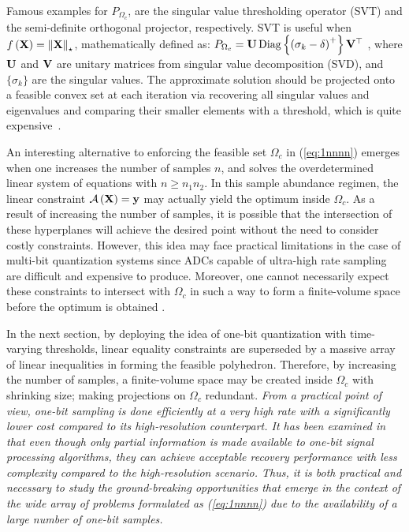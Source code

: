 \documentclass[12pt,draftcls,onecolumn]{IEEEtran}
\begin{document}
Famous examples for $P_{\Omega_{c}}$, are the singular value thresholding operator (SVT) and the semi-definite orthogonal projector, respectively. SVT is useful when $f\left(\mathbf{X}\right)=\left\|\mathbf{X}\right\|_{\star}$, mathematically defined as:
$P_{\Omega_{c}} = \mathbf{U} \operatorname{Diag}\left\{\left(\sigma_{k}-\delta\right)^{+}\right\}\mathbf{V}^{\top}$ \cite{cai2010singular},
where $\mathbf{U}$ and $\mathbf{V}$ are unitary matrices from singular value decomposition (SVD), and $\{\sigma_{k}\}$ are the singular values. %
The approximate solution should be projected onto a feasible convex set at each iteration via recovering all singular values and eigenvalues and comparing their smaller elements with a threshold, which is quite expensive~\cite{candes2015phase}. 

An interesting alternative to enforcing the feasible set $\Omega_{c}$ in (\ref{eq:1nnnn}) emerges when one increases the number of samples $n$, and solves the overdetermined linear system of equations with $n\geq n_{1}n_{2}$. In this sample abundance regimen, the linear constraint $\mathcal{A}\left( \mathbf{X}\right)=\mathbf{y}$ may actually yield the optimum inside $\Omega_{c}$. As a result of increasing the number of samples, it is possible that the intersection of these hyperplanes will achieve the desired point without the need to consider costly constraints. However, this idea may face practical limitations in the case of multi-bit quantization systems since ADCs capable of ultra-high rate sampling are difficult and expensive to produce. Moreover, one cannot necessarily expect these constraints to intersect with $\Omega_{c}$ in such a way to form a finite-volume space before the optimum is obtained \cite{eamaz2022phase,candes2013phaselift}.

In the next section, by deploying the idea of one-bit quantization with time-varying thresholds, linear equality constraints are superseded by a massive array of linear inequalities in forming the feasible polyhedron. Therefore, by increasing the number of samples, a finite-volume space may be created inside $\Omega_{c}$ with shrinking size; making projections on $\Omega_{c}$ redundant. \emph{From a practical point of view, one-bit sampling is done efficiently at a very high rate with a significantly lower cost compared to its high-resolution counterpart. It has been examined in \cite{eamaz2022phase} that even though only partial information is made available to one-bit signal processing algorithms, they can achieve acceptable recovery performance with less complexity compared to the high-resolution scenario. Thus, it is both practical and necessary to study the ground-breaking opportunities that emerge in the context of the wide array of problems formulated as (\ref{eq:1nnnn}) due to the availability of a large number of one-bit samples.}
\end{document}
